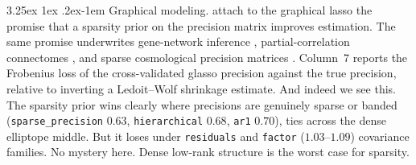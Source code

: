 \documentclass[11pt]{article}
\makeatletter
\renewcommand\paragraph{\@startsection{paragraph}{4}{\z@}%
  {3.25ex \@plus1ex \@minus.2ex}{-1em}%
  {\normalfont\normalsize\itshape}}
\makeatother
\begin{document}
\paragraph{Graphical modeling.} \citet{friedman2008} attach to the graphical lasso the promise that a sparsity prior on the
precision matrix improves estimation. The same promise underwrites
gene-network inference \citep{schafer2005}, partial-correlation
connectomes \citep{smith2011}, and sparse cosmological precision matrices
\citep{padmanabhan2016}. Column~7
reports the Frobenius loss of the cross-validated glasso precision
against the true precision, relative to inverting a Ledoit--Wolf
shrinkage estimate. And indeed we see this. The sparsity prior wins clearly where precisions are
genuinely sparse or banded (\texttt{sparse\_precision} $0.63$,
\texttt{hierarchical} $0.68$, \texttt{ar1} $0.70$), ties across the dense
elliptope middle. But it loses under \texttt{residuals} and \texttt{factor}
($1.03$--$1.09$) covariance families. No mystery here. Dense low-rank structure is the worst case for
sparsity.
\end{document}
